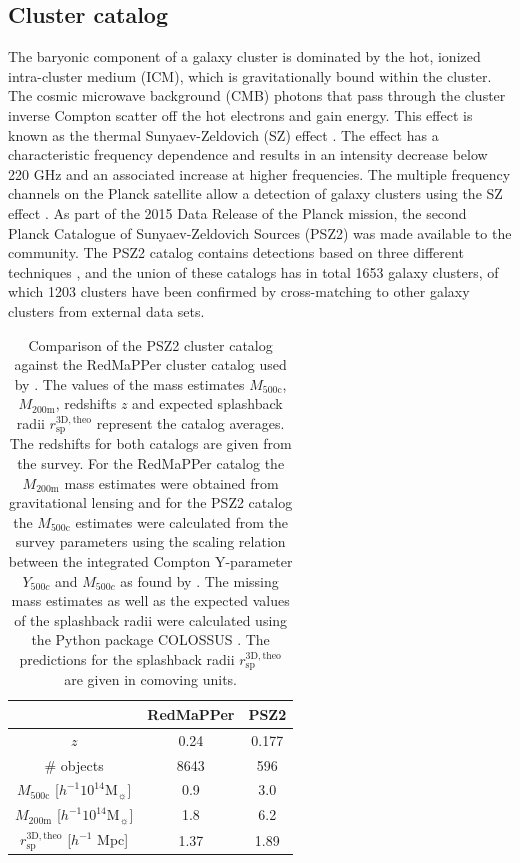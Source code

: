 \documentclass[iop, apjl, twocolappendix, numberedappendix]{emulateapj}
\begin{document}
\subsection{Cluster catalog}
\label{sec:clusters}
The baryonic component of a galaxy cluster is dominated by the hot,
ionized  intra-cluster medium (ICM), which is gravitationally bound
within the cluster. The cosmic microwave background (CMB) photons
that pass through the cluster inverse Compton scatter off the hot
electrons and gain energy. This effect is known as the thermal
Sunyaev-Zeldovich (SZ) effect
\citep{sunyaev1970small,sunyaev1980velocity}. The effect has a
characteristic frequency dependence and results in an intensity
decrease below 220 GHz and an associated increase at higher
frequencies. The multiple frequency channels on the Planck satellite
allow a detection of galaxy clusters using the SZ effect
\citep{collaboration2016planck}. As part of the 2015 Data Release of
the Planck mission, the second Planck Catalogue of Sunyaev-Zeldovich
Sources (PSZ2) was made available to the community. The PSZ2 catalog
contains detections based on  three different techniques
\citep{ade2016planck}, and the union of these catalogs has in total
1653 galaxy clusters, of which 1203 clusters have been confirmed by
cross-matching to other galaxy clusters from external data sets. 
\begin{table}
    \centering
    \caption{Comparison of the PSZ2 cluster catalog
    against the RedMaPPer cluster catalog used by
\citet{more2016detection}. The values of the mass estimates
$M_{\mathrm{500c}}$, $M_{\mathrm{200m}}$, redshifts $z$ and expected
splashback radii $r^{\mathrm{3D,theo}}_{\mathrm{sp}}$ represent the
catalog averages. The redshifts for both catalogs are given from the
survey. For the RedMaPPer catalog the $M_{\mathrm{200m}}$ mass
estimates were obtained from gravitational lensing and for the PSZ2
catalog the $M_{\mathrm{500c}}$ estimates were calculated from the
survey parameters using the scaling relation between the integrated
Compton Y-parameter $Y_{500c}$ and $M_{500c}$ as found by
\citet{ade2014planck}. The missing mass estimates as well as the
expected values of the splashback radii were calculated using the
Python package COLOSSUS \citep{diemer2017colossus}. The predictions
for the splashback radii $r^{\mathrm{3D,theo}}_{\mathrm{sp}}$ are
given in comoving units.}
    \label{tab:cluster_catalogs} 
    \begin{tabular}{ccc}
    \hline 
    & RedMaPPer & PSZ2 \\
    \hline 
    $z$ & 0.24 & 0.177 \\
    \hline 
    \# objects & 8643 & 596\\
    \hline
    $M_{\mathrm{500c}}$ [$h^{-1}10^{14} $M$_{\sun}$] & 0.9 & 3.0 \\
    \hline
    $M_{\mathrm{200m}}$ [$h^{-1}10^{14} $M$_{\sun}$] & 1.8 & 6.2\\ 
    \hline
    $r^{\mathrm{3D,theo}}_{\mathrm{sp}}$ [$h^{-1}$ Mpc] & 1.37 & 1.89 \\
    \hline
    \end{tabular} 
\end{table}
\end{document}
